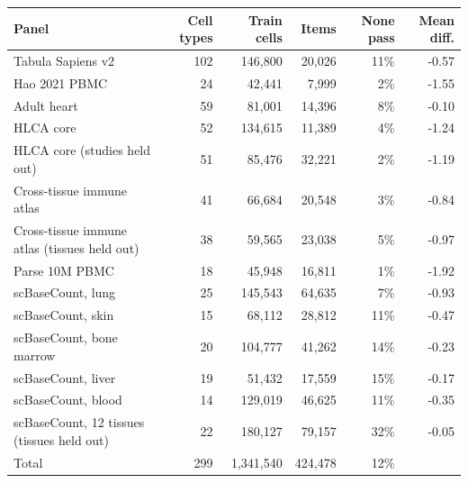 \begin{tabular}{@{}lrrrrr@{}}
\toprule
Panel & Cell types & Train cells & Items & None pass & Mean diff. \\
\midrule
Tabula Sapiens v2 & 102 & 146,800 & 20,026 & 11\% & -0.57 \\
Hao 2021 PBMC & 24 & 42,441 & 7,999 & 2\% & -1.55 \\
Adult heart & 59 & 81,001 & 14,396 & 8\% & -0.10 \\
HLCA core & 52 & 134,615 & 11,389 & 4\% & -1.24 \\
HLCA core (studies held out) & 51 & 85,476 & 32,221 & 2\% & -1.19 \\
Cross-tissue immune atlas & 41 & 66,684 & 20,548 & 3\% & -0.84 \\
Cross-tissue immune atlas (tissues held out) & 38 & 59,565 & 23,038 & 5\% & -0.97 \\
Parse 10M PBMC & 18 & 45,948 & 16,811 & 1\% & -1.92 \\
scBaseCount, lung & 25 & 145,543 & 64,635 & 7\% & -0.93 \\
scBaseCount, skin & 15 & 68,112 & 28,812 & 11\% & -0.47 \\
scBaseCount, bone marrow & 20 & 104,777 & 41,262 & 14\% & -0.23 \\
scBaseCount, liver & 19 & 51,432 & 17,559 & 15\% & -0.17 \\
scBaseCount, blood & 14 & 129,019 & 46,625 & 11\% & -0.35 \\
scBaseCount, 12 tissues (tissues held out) & 22 & 180,127 & 79,157 & 32\% & -0.05 \\
\midrule
Total & 299 & 1,341,540 & 424,478 & 12\% & \\
\bottomrule
\end{tabular}
